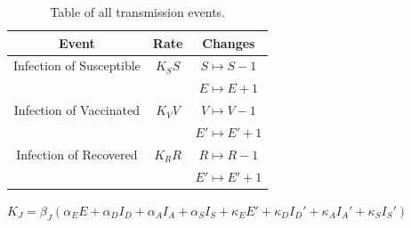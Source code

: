 \documentclass[a4paper,11pt]{article}
\theoremstyle{plain}
\theoremstyle{definition}
\begin{document}
\begin{table}[hbtp]
		\begin{center}
			\caption{Table of all transmission events.}
			\begin{tabular}{ c|c|c }
				Event & Rate & Changes \\ 
	        	\hline
		        \hline
		        Infection of Susceptible & $K_SS$ & $S \mapsto S - 1$ \\
		        &  &  $E \mapsto E + 1$\\
		        \hline
		        Infection of Vaccinated & $K_VV$ & $V \mapsto V - 1$ \\
		        &  & $E' \mapsto E' + 1$ \\
	        	\hline
	        	Infection of Recovered & $K_RR$ & $R \mapsto R - 1$ \\
	        	&  & $E' \mapsto E' + 1$ \\
			\end{tabular}
			\label{tab:E}
		\end{center}
\end{table}

$K_J = \beta_J (\alpha_E E + \alpha_D I_D + \alpha_A I_A + \alpha_S I_S + \kappa_E E' + \kappa_D I_D' + \kappa_A I_A' + \kappa_S I_S')$
	
\end{document}
